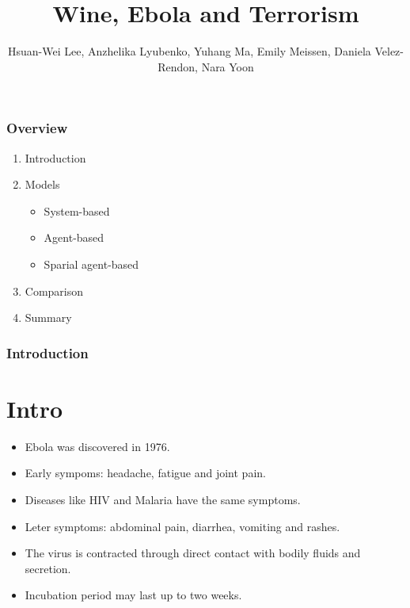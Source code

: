 \documentclass[30pt]{beamer}
\author{ Hsuan-Wei Lee,
  Anzhelika Lyubenko,
  Yuhang Ma,
  Emily Meissen,
  Daniela Velez-Rendon,
    Nara Yoon}
\title[]{Wine, Ebola and Terrorism}
\begin{document}
\begin{frame}[t,plain]
    \titlepage
\end{frame}

\begin{frame}[t,plain]
    \frametitle{Overview}
\begin{enumerate}
\vfill
\item Introduction
\item Models
\begin{itemize}
\item System-based
\item Agent-based
\item Sparial agent-based
\end{itemize}
\item Comparison
\item Summary
\end{enumerate}
\end{frame}

\begin{frame}
\frametitle{Introduction}
\section{Intro}
\begin{itemize}
\item Ebola was discovered in 1976.
\item Early sympoms:  headache, fatigue and joint pain. 
\item Diseases like HIV and Malaria have the same symptoms.
\item Leter symptoms: abdominal pain, diarrhea, vomiting and rashes. 
\item The virus is contracted through direct contact with bodily fluids and secretion.
\item Incubation period may last up to two weeks.
\end{itemize}
\end{frame}
\end{document}
